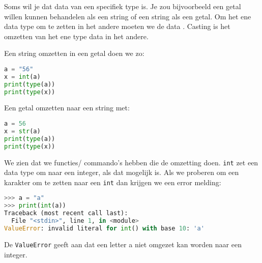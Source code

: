 Soms wil je dat data van een specifiek type is. Je zou bijvoorbeeld een getal willen kunnen behandelen als een string of een string als een getal. Om het ene data type om te zetten in het andere moeten we de data . Casting is het omzetten van het ene type data in het andere.

Een string omzetten in een getal doen we zo:
\begin{lstlisting}[language=python]
a = "56"
x = int(a)
print(type(a))
print(type(x))
\end{lstlisting}
Een getal omzetten naar een string met:
\begin{lstlisting}[language=python]
a = 56
x = str(a)
print(type(a))
print(type(x))
\end{lstlisting}

We zien dat we functies/ commando's hebben die de omzetting doen. \texttt{int} zet een data type om naar een integer, als dat mogelijk is. Als we proberen om een karakter om te zetten naar een \texttt{int} dan krijgen we een error melding:
\begin{lstlisting}[language=python]
>>> a = "a"
>>> print(int(a))
Traceback (most recent call last):
  File "<stdin>", line 1, in <module>
ValueError: invalid literal for int() with base 10: 'a'
\end{lstlisting}
De \texttt{ValueError} geeft aan dat een letter a niet omgezet kan worden naar een integer.

